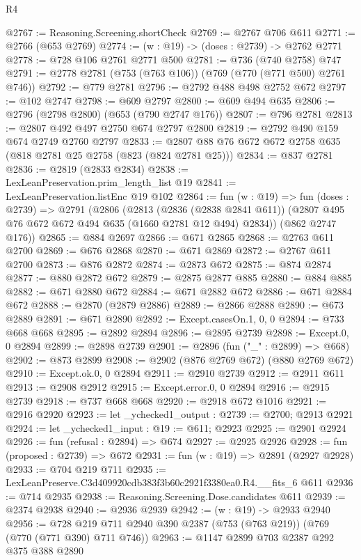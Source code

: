 \begin{lexlean}{R4}
\begin{coremodule}
@2767 := Reasoning.Screening.shortCheck
@2769 := @2767 @706 @611
@2771 := @2766 (@653 @2769)
@2774 := (w : @19) -> (doses : @2739) -> @2762 @2771
@2778 := @728 @106 @2761 @2771 @500
@2781 := @736 (@740 @2758) @747
@2791 := @2778 @2781 (@753 (@763 @106)) (@769 (@770 (@771 @500) @2761 @746))
@2792 := @779 @2781
@2796 := @2792 @488 @498 @2752 @672
@2797 := @102 @2747
@2798 := @609 @2797
@2800 := @609 @494 @635
@2806 := @2796 (@2798 @2800) (@653 (@790 @2747 @176))
@2807 := @796 @2781
@2813 := @2807 @492 @497 @2750 @674 @2797 @2800
@2819 := @2792 @490 @159 @674 @2749 @2760 @2797
@2833 := @2807 @88 @76 @672 @672 @2758 @635 (@818 @2781 @25 @2758 (@823 (@824 @2781 @25)))
@2834 := @837 @2781
@2836 := @2819 (@2833 @2834)
@2838 := LexLeanPreservation.prim_length_list @19
@2841 := LexLeanPreservation.listEnc @19 @102
@2864 := fun (w : @19) =>
  fun (doses : @2739) =>
  @2791
    (@2806
      (@2813
        (@2836 (@2838 @2841 @611))
        (@2807 @495 @76 @672 @672 @494 @635 (@1660 @2781 @12 @494) @2834))
      (@862 @2747 @176))
@2865 := @884 @2697
@2866 := @671 @2865
@2868 := @2763 @611 @2700
@2869 := @676 @2868
@2870 := @671 @2869
@2872 := @2767 @611 @2700
@2873 := @876 @2872
@2874 := @2873 @672
@2875 := @874 @2874
@2877 := @880 @2872 @672
@2879 := @2875 @2877 @885
@2880 := @884 @885
@2882 := @671 @2880 @672
@2884 := @671 @2882 @672
@2886 := @671 @2884 @672
@2888 := @2870 (@2879 @2886)
@2889 := @2866 @2888
@2890 := @673 @2889
@2891 := @671 @2890
@2892 := Except.casesOn.{1, 0, 0}
@2894 := @733 @668 @668
@2895 := @2892 @2894
@2896 := @2895 @2739
@2898 := Except.{0, 0} @2894
@2899 := @2898 @2739
@2901 := @2896 (fun ("_" : @2899) => @668)
@2902 := @873 @2899
@2908 := @2902 (@876 @2769 @672) (@880 @2769 @672)
@2910 := Except.ok.{0, 0} @2894
@2911 := @2910 @2739
@2912 := @2911 @611
@2913 := @2908 @2912
@2915 := Except.error.{0, 0} @2894
@2916 := @2915 @2739
@2918 := @737 @668 @668
@2920 := @2918 @672 @1016
@2921 := @2916 @2920
@2923 := let _ychecked1_output : @2739 := @2700; @2913 @2921
@2924 := let _ychecked1_input : @19 := @611; @2923
@2925 := @2901 @2924
@2926 := fun (refusal : @2894) => @674
@2927 := @2925 @2926
@2928 := fun (proposed : @2739) => @672
@2931 := fun (w : @19) => @2891 (@2927 @2928)
@2933 := @704 @219 @711
@2935 := LexLeanPreserve.C3d409920cdb383f3b60c2921f3380ea0.R4.__fits_6 @611
@2936 := @714 @2935
@2938 := Reasoning.Screening.Dose.candidates @611
@2939 := @2374 @2938
@2940 := @2936 @2939
@2942 := (w : @19) -> @2933 @2940
@2956 := @728 @219 @711 @2940 @390 @2387 (@753 (@763 @219)) (@769 (@770 (@771 @390) @711 @746))
@2963 := @1147 @2899 @703 @2387 @292 @375 @388 @2890

\end{coremodule}
\end{lexlean}
